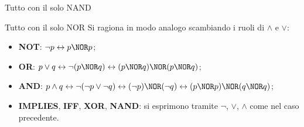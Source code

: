 \begin{concetto}
\begin{dimostrazione}
\begin{caso}{Tutto con il solo NAND}
    \end{caso}
    \begin{caso}{Tutto con il solo NOR}
        Si ragiona in modo analogo scambiando i ruoli di $\wedge$ e $\vee$:
        \begin{itemize}
            \item \textbf{NOT}: $\neg p \leftrightarrow p \NOR p$;
            \item \textbf{OR}: $p \vee q \leftrightarrow \neg(p \NOR q) \leftrightarrow (p \NOR q) \NOR (p \NOR q)$;
            \item \textbf{AND}: $p \wedge q \leftrightarrow \neg(\neg p \vee \neg q) \leftrightarrow (\neg p) \NOR (\neg q) \leftrightarrow (p \NOR p) \NOR (q \NOR q)$;
            \item \textbf{IMPLIES}, \textbf{IFF}, \textbf{XOR}, \textbf{NAND}: si esprimono tramite $\neg$, $\vee$, $\wedge$ come nel caso precedente.
        \end{itemize}
    \end{caso}
\end{dimostrazione}
\end{concetto}

